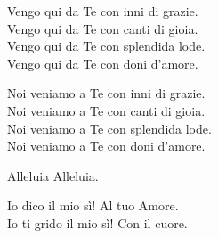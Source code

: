 
\strofa Vengo qui da Te con inni di grazie.\\
Vengo qui da Te con canti di gioia.\\
Vengo qui da Te con splendida lode.\\
Vengo qui da Te con doni d'amore.

\spazio


\spazio

\strofa Noi veniamo a Te con inni di grazie.\\
Noi veniamo a Te con canti di gioia.\\
Noi veniamo a Te con splendida lode.\\
Noi veniamo a Te con doni d'amore.

\spazio


\spazio

Alleluia Alleluia. 

\spazio

\strofa Io dico il mio sì! Al tuo Amore.\\
Io ti grido il mio sì! Con il cuore. 

\spazio

 